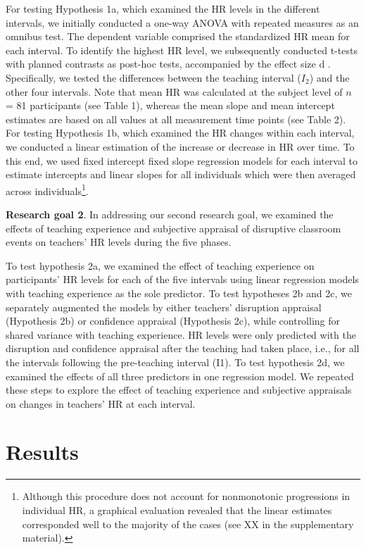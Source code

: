 \documentclass[preprint, 3p,
authoryear]{elsarticle} %
\begin{document}
For testing Hypothesis 1a, which examined the HR levels in the different
intervals, we initially conducted a one-way ANOVA with repeated measures
as an omnibus test. The dependent variable comprised the standardized HR
mean for each interval. To identify the highest HR level, we
subsequently conducted t-tests with planned contrasts as post-hoc tests,
accompanied by the effect size d \citep{cohen1988new}. Specifically, we
tested the differences between the teaching interval (\(I_2\)) and the
other four intervals. Note that mean HR was calculated at the subject
level of \(n\) = 81 participants (see Table 1), whereas the mean slope
and mean intercept estimates are based on all values at all measurement
time points (see Table 2). For testing Hypothesis 1b, which examined the
HR changes within each interval, we conducted a linear estimation of the
increase or decrease in HR over time. To this end, we used fixed
intercept fixed slope regression models \citep{gelman2006data} for each
interval to estimate intercepts and linear slopes for all individuals
which were then averaged across individuals\footnote{Although this
  procedure does not account for nonmonotonic progressions in individual
  HR, a graphical evaluation revealed that the linear estimates
  corresponded well to the majority of the cases (see XX in the
  supplementary material).}.

\textbf{Research goal 2}. In addressing our second research goal, we
examined the effects of teaching experience and subjective appraisal of
disruptive classroom events on teachers' HR levels during the five
phases.

To test hypothesis 2a, we examined the effect of teaching experience on
participants' HR levels for each of the five intervals using linear
regression models with teaching experience as the sole predictor. To
test hypotheses 2b and 2c, we separately augmented the models by either
teachers' disruption appraisal (Hypothesis 2b) or confidence appraisal
(Hypothesis 2c), while controlling for shared variance with teaching
experience. HR levels were only predicted with the disruption and
confidence appraisal after the teaching had taken place, i.e., for all
the intervals following the pre-teaching interval (I1). To test
hypothesis 2d, we examined the effects of all three predictors in one
regression model. We repeated these steps to explore the effect of
teaching experience and subjective appraisals on changes in teachers' HR
at each interval.

\section{Results}\label{results}
\end{document}

